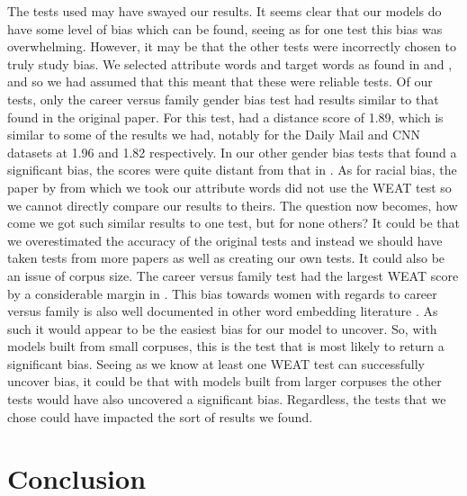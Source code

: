 \documentclass[10pt,letterpaper]{article}
\begin{document}
The tests used may have swayed our results. It seems clear that our models do have some level of bias which can be found, seeing as for one test this bias was overwhelming. However, it may be that the other tests were incorrectly chosen to truly study bias. We selected attribute words and target words as found in  and , and so we had assumed that this meant that these were reliable tests. Of our tests, only the career versus family gender bias test had results similar to that found in the original paper. For this test,  had a distance score of 1.89, which is similar to some of the results we had, notably for the Daily Mail and CNN datasets at 1.96 and 1.82 respectively. In our other gender bias tests that found a significant bias, the scores were quite distant from that in . As for racial bias, the paper by  from which we took our attribute words did not use the WEAT test so we cannot directly compare our results to theirs. The question now becomes, how come we got such similar results to one test, but for none others? It could be that we overestimated the accuracy of the original tests and instead we should have taken tests from more papers as well as creating our own tests. It could also be an issue of corpus size. The career versus family test had the largest WEAT score by a considerable margin in . This bias towards women with regards to career versus family is also well documented in other word embedding literature \cite{Bolukbasi2016a}. As such it would appear to be the easiest bias for our model to uncover. So, with models built from small corpuses, this is the test that is most likely to return a significant bias. Seeing as we know at least one WEAT test can successfully uncover bias, it could be that with models built from larger corpuses the other tests would have also uncovered a significant bias. Regardless, the tests that we chose could have impacted the sort of results we found.

\section{Conclusion}
\end{document}
